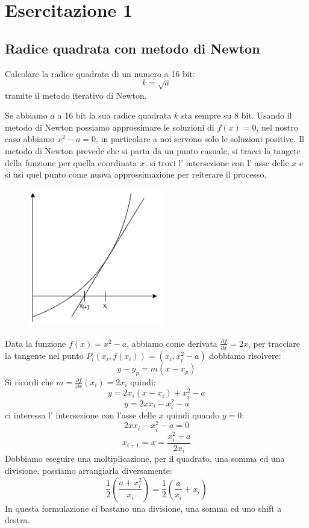 \section{Esercitazione 1}

\subsection{Radice quadrata con metodo di Newton}
Calcolare la radice quadrata di un numero a 16 bit:
$$ k = \sqrt{a} $$
tramite il metodo iterativo di Newton.

Se abbiamo $a$ a 16 bit la sua radice quadrata $k$ sta sempre su 8 bit.
Usando il metodo di Newton possiamo approssimare le soluzioni di $f(x) = 0$, nel nostro caso abbiamo $x^2 - a = 0$, in particolare a noi servono solo le soluzioni positive.
Il metodo di Newton prevede che si parta da un punto casuale, si tracci la tangete della funzione per quella coordinata $x$, si trovi l' intersezione con l' asse delle $x$ e si usi quel punto come nuova approssimazione per reiterare il processo.
\begin{figure}[H]
    \centering
    \includegraphics[width=220px]{images/13_Esercitazione_1/metodo_di_newton.png}
\end{figure}

Data la funzione $f(x) = x^2 - a$, abbiamo come derivata $\frac{\partial f}{\partial x} = 2x$, per tracciare la tangente nel punto $P_i(x_i, f(x_i)) = (x_i, x_i^2-a)$ dobbiamo risolvere:
$$ y - y_p = m(x - x_p) $$
Si ricordi che $m = \frac{\partial f}{\partial x}(x_i) = 2x_i$ quindi:
$$ y = 2x_i(x-x_i) + x_i^2 - a $$
$$ y = 2xx_i - x_i^2 - a $$
ci interessa l' intersezione con l'asse delle $x$ quindi quando $y=0$:
$$ 2xx_i - x_i^2 - a = 0 $$
$$ x_{i+1} = x = \frac{x_i^2 + a}{2x_i} $$
Dobbiamo eseguire una moltiplicazione, per il quadrato, una somma ed una divisione, possiamo arrangiarla diversamente:
$$ \frac{1}{2} \left( \frac{a + x_i^2}{x_i} \right) = \frac{1}{2} \left( \frac{a}{x_i} + x_i \right) $$
In questa formulazione ci bastano una divisione, una somma ed uno shift a destra.

